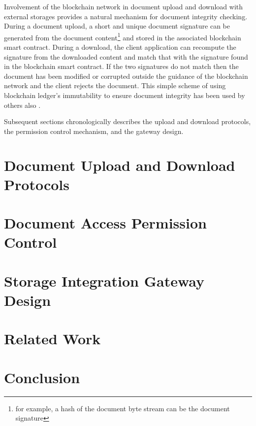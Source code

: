 \documentclass[conference]{IEEEtran}
\begin{document}
Involvement of the blockchain network in document upload and download with external storages provides a natural mechanism for document integrity checking. During a document upload, a short and unique document signature can be generated from the document content\footnote{for example, a hash of the document byte stream can be the document signature} and stored in the associated blockchain smart contract. During a download, the client application can recompute the signature from the downloaded content and match that with the signature found in the blockchain smart contract. If the two signatures do not match then the document has been modified or corrupted outside the guidance of the blockchain network and the client rejects the document. This simple scheme of using blockchain ledger's immutability to ensure document integrity has been used by others also \cite{stampIO}.  

Subsequent sections chronologically describes the upload and download protocols, the permission control mechanism, and the gateway design.

\section{Document Upload and Download Protocols}
\label{s-updown}

\section{Document Access Permission Control}
\label{s-accr}

\section{Storage Integration Gateway Design}
\label{s-gate}

\section{Related Work}
\label{s-rw}

\section{Conclusion}
\label{s-con}
 


\end{document}
